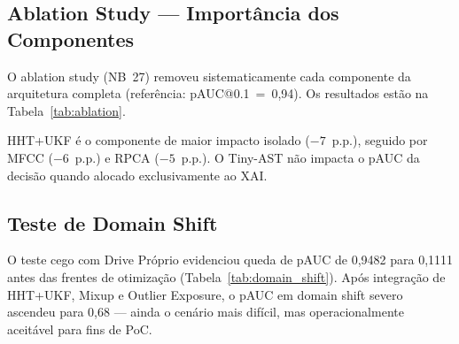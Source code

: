 \subsection{Ablation Study --- Importância dos Componentes}

O ablation study (NB~27) removeu sistematicamente cada componente da arquitetura completa
(referência: pAUC@0.1~=~0,94). Os resultados estão na Tabela~\ref{tab:ablation}.

\begin{table}[H]
\centering
\footnotesize
{}
\caption{Ablation study: impacto da remoção de cada componente sobre pAUC@0.1.}
\label{tab:ablation}
\end{table}

HHT+UKF é o componente de maior impacto isolado ($-7$~p.p.), seguido por MFCC ($-6$~p.p.) e RPCA
($-5$~p.p.). O Tiny-AST não impacta o pAUC da decisão quando alocado exclusivamente ao XAI.

\subsection{Teste de Domain Shift}

O teste cego com Drive Próprio evidenciou queda de pAUC de 0,9482 para 0,1111 antes das frentes de
otimização (Tabela~\ref{tab:domain_shift}). Após integração de HHT+UKF, Mixup e Outlier Exposure,
o pAUC em domain shift severo ascendeu para 0,68 --- ainda o cenário mais difícil, mas operacionalmente
aceitável para fins de PoC.

